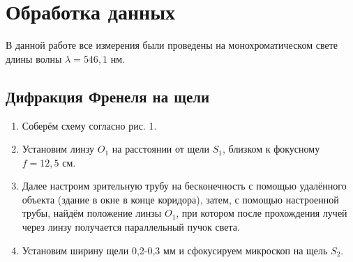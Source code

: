 \documentclass[a4paper,12pt]{article}
\begin{document}

\section{Обработка данных} 
В данной работе все измерения были проведены на монохроматическом свете длины волны $\lambda = 546,1$ нм.
\subsection{Дифракция Френеля на щели}
\begin{enumerate}
    \item
    Соберём схему согласно рис. 1.

    \item
    Установим линзу $O_1$ на расстоянии от щели $S_1$, близком к фокусному $f = 12,5$ см. 

    \item
    Далее настроим зрительную трубу на бесконечность с помощью удалённого объекта (здание в окне в конце коридора), затем, с помощью настроенной трубы, найдём положение линзы $O_1$, при котором после прохождения лучей через линзу получается параллельный пучок света.
    
    \item 
    Установим ширину щели 0,2-0,3 мм и сфокусируем микроскоп на щель $S_2$.


\end{enumerate}
\end{document}
